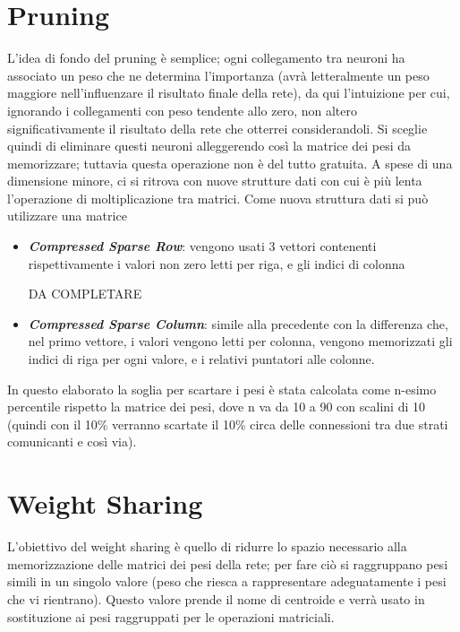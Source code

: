\documentclass[12pt]{report}
\begin{document}
\section{Pruning}

L’idea di fondo del pruning è semplice; ogni collegamento tra neuroni ha associato un peso che ne determina l’importanza (avrà letteralmente un peso maggiore nell’influenzare il risultato finale della rete), da qui l’intuizione per cui, ignorando i collegamenti con peso tendente allo zero, non altero significativamente il risultato della rete che otterrei considerandoli. 
Si sceglie quindi di eliminare questi neuroni alleggerendo così la matrice dei pesi da memorizzare; tuttavia questa operazione non è del tutto gratuita. A spese di una dimensione minore, ci si ritrova con nuove strutture dati con cui è più lenta l'operazione di moltiplicazione tra matrici. Come nuova struttura dati si può utilizzare una matrice
\begin{itemize}
\item{\textbf{\textit{Compressed Sparse Row}}}: vengono usati 3 vettori contenenti rispettivamente i valori non zero letti per riga,  e gli indici di colonna
\begin{center}
\large
DA COMPLETARE
\end{center}
\item{\textbf{\textit{Compressed Sparse Column}}}: simile alla precedente con la differenza che, nel primo vettore, i valori vengono letti per colonna, vengono memorizzati gli indici di riga per ogni valore, e i relativi puntatori alle colonne.
\end{itemize}


In questo elaborato la soglia per scartare i pesi è stata calcolata come n-esimo percentile rispetto la matrice dei pesi, dove n va da 10 a 90 con scalini di 10 (quindi con il 10\% verranno scartate il 10\% circa delle connessioni tra due strati comunicanti e così via).

\section{Weight Sharing}

L’obiettivo del weight sharing è quello di ridurre lo spazio necessario alla memorizzazione delle matrici dei pesi della rete; per fare ciò si raggruppano pesi simili in un singolo valore (peso che riesca a rappresentare adeguatamente i pesi che vi rientrano). Questo valore prende il nome di centroide e verrà usato in sostituzione ai pesi raggruppati per le operazioni matriciali. 
\end{document}
